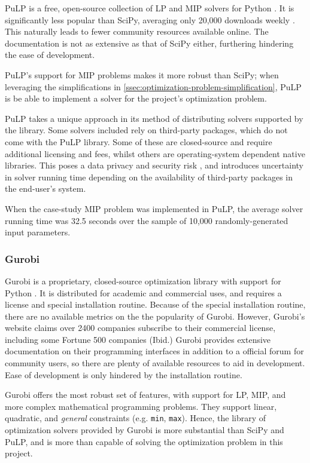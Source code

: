 \documentclass[../mthe-493-final-project.tex]{subfiles}
\begin{document}
    PuLP is a free, open-source collection of LP and MIP solvers for Python \cite{Mitchell11pulp}. It is significantly less popular than SciPy, averaging only 20,000 downloads weekly \cite{flynn_2018_pulp}. This naturally leads to fewer community resources available online. The documentation is not as extensive as that of SciPy either, furthering hindering the ease of development.
    
    PuLP's support for MIP problems makes it more robust than SciPy; when leveraging the simplifications in \autoref{ssec:optimization-problem-simplification}, PuLP is be able to implement a solver for the project's optimization problem.
    
    PuLP takes a unique approach in its method of distributing solvers supported by the library. Some solvers included rely on third-party packages, which do not come with the PuLP library. Some of these are closed-source and require additional licensing and fees, whilst others are operating-system dependent native libraries. This poses a data privacy and security risk \cite{clarke2009open}, and introduces uncertainty in solver running time depending on the availability of third-party packages in the end-user's system.
    
    When the case-study MIP problem was implemented in PuLP, the average solver running time was 32.5 seconds over the sample of 10,000 randomly-generated input parameters.
    
    \subsubsection{Gurobi}
    \label{sssec:optimization-candidate-gurobi}
    
    Gurobi is a proprietary, closed-source optimization library with support for Python \cite{gurobi}. It is distributed for academic and commercial uses, and requires a license and special installation routine. Because of the special installation routine, there are no available metrics on the the popularity of Gurobi. However, Gurobi's website claims over 2400 companies subscribe to their commercial license, including some Fortune 500 companies (Ibid.) Gurobi provides extensive documentation on their programming interfaces in addition to a official forum for community users, so there are plenty of available resources to aid in development. Ease of development is only hindered by the installation routine.
    
    Gurobi offers the most robust set of features, with support for LP, MIP, and more complex mathematical programming problems. They support linear, quadratic, and \textit{general} constraints (e.g. \texttt{min}, \texttt{max}). Hence, the library of optimization solvers provided by Gurobi is more substantial than SciPy and PuLP, and is more than capable of solving the optimization problem in this project.
    
\end{document}
